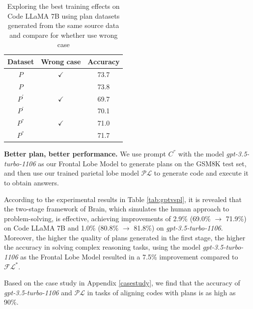 \documentclass[11pt]{article}
\begin{document}
\begin{table}[h]
\centering
\small
{%
\begin{tabular}{ccc}
\hline
\textbf{Dataset} & \textbf{Wrong case} & \textbf{Accuracy} \\
\hline
$P$ & $\checkmark$ & 73.7 \\
$P$ &  & 73.8 \\
$P^{'}$ & $\checkmark$ &  69.7 \\
$P^{'}$ &  &  70.1 \\
$P^{''}$ & $\checkmark$  & 71.0 \\
$P^{''}$ &  & 71.7 \\
\hline
\end{tabular}
}
\caption{Exploring the best training effects on Code LLaMA 7B using plan datasets generated from the same source data and compare for whether use wrong case }
\label{tab:Q+CvsQ+S}
\end{table}

\textbf{Better plan, better performance.} We use prompt $C^{''}$ with the model \textit{gpt-3.5-turbo-1106} as our Frontal Lobe Model to generate plans on the GSM8K test set, and then use our trained parietal lobe model $\mathcal{PL}$ to generate code and execute it to obtain answers. 

According to the experimental results in Table \ref{tab:gptvspl}, it is revealed that the two-stage framework of Brain, which simulates the human approach to problem-solving, is effective, achieving improvements of 2.9\% (69.0\% $\rightarrow$ 71.9\%) on Code LLaMA 7B and 1.0\% (80.8\% $\rightarrow$ 81.8\%) on \textit{gpt-3.5-turbo-1106}. Moreover, the higher the quality of plans generated in the first stage, the higher the accuracy in solving complex reasoning tasks, using the model \textit{gpt-3.5-turbo-1106} as the Frontal Lobe Model resulted in a 7.5\% improvement compared to $\mathcal{FL}^{*}$.

Based on the case study in Appendix \ref{casestudy}, we find that the accuracy of \textit{gpt-3.5-turbo-1106} and $\mathcal{PL}$ in tasks of aligning codes with plans is as high as 90\%. 
\end{document}
